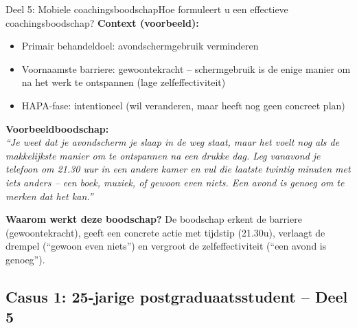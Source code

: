 \documentclass[11pt,a4paper]{article}
\begin{document}
\vspace{0.5em}
\nopagebreak[4]

\begin{voorbeeldbox}{Deel 5: Mobiele coachingsboodschap}{Hoe formuleert u een effectieve coachingsboodschap?}
\small
\textbf{Context (voorbeeld):}
\begin{itemize}[topsep=2pt,itemsep=1pt]
\item Primair behandeldoel: avondschermgebruik verminderen
\item Voornaamste barriere: gewoontekracht -- schermgebruik is de enige manier om na het werk te ontspannen (lage zelfeffectiviteit)
\item HAPA-fase: intentioneel (wil veranderen, maar heeft nog geen concreet plan)
\end{itemize}

\medskip
\textbf{Voorbeeldboodschap:}\\[0.2em]
\textit{``Je weet dat je avondscherm je slaap in de weg staat, maar het voelt nog als de makkelijkste manier om te ontspannen na een drukke dag. Leg vanavond je telefoon om 21.30 uur in een andere kamer en vul die laatste twintig minuten met iets anders -- een boek, muziek, of gewoon even niets. Een avond is genoeg om te merken dat het kan.''}

\medskip\small
\textbf{Waarom werkt deze boodschap?}
De boodschap erkent de barriere (gewoontekracht), geeft een concrete actie met tijdstip (21.30u), verlaagt de drempel (``gewoon even niets'') en vergroot de zelfeffectiviteit (``een avond is genoeg'').
\end{voorbeeldbox}

\vspace{0.5em}

\newpage
\subsection*{Casus 1: 25-jarige postgraduaatsstudent -- Deel 5}
\end{document}
